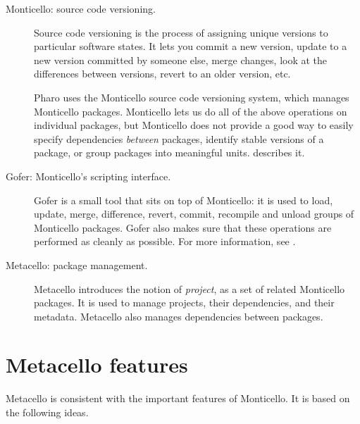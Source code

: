 \documentclass[a4paper,10pt,twoside]{book}
\begin{document}
\begin{description}

\item[Monticello: source code versioning.]
Source code versioning is the process of assigning unique versions to particular software states.  It lets you commit a new version, update to a new version committed by someone else, merge changes, look at the differences between versions,  revert to an older version, etc. 

Pharo uses the Monticello source code versioning system, which manages Monticello packages.  Monticello lets us do all of the above operations on individual packages, but Monticello does not provide a good way to easily specify dependencies \emph{between} packages, identify stable versions of a package, or group packages into meaningful units.  describes it. 

\item[Gofer: Monticello's scripting interface.]
Gofer is a small tool that sits on top of Monticello: it is used to load, update, merge, difference, revert, commit, recompile and unload groups of Monticello packages. Gofer also makes sure that these operations are performed as cleanly as possible. 
For more information, see .



\item[Metacello: package management.] Metacello introduces the notion of \emph{project}, as a set of related Monticello packages. It is used to manage projects,   their dependencies, and their metadata. 
Metacello also manages dependencies between packages.
\end{description}




\section{Metacello features}

Metacello is consistent with the important features of Monticello. It is based on the following ideas.
\end{document}

